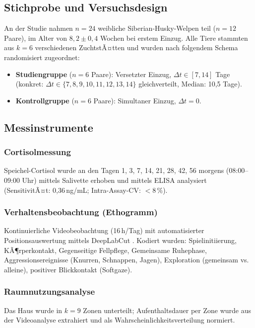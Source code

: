 ﻿\documentclass[12pt, a4paper]{article}
\theoremstyle{plain}
\theoremstyle{definition}
\theoremstyle{remark}
\newcommand{\dt}{\Delta t}
\begin{document}
\subsection{Stichprobe und Versuchsdesign}

An der Studie nahmen $n = 24$ weibliche Siberian-Husky-Welpen teil ($n = 12$
Paare), im Alter von $8{,}2 \pm 0{,}4$ Wochen bei erstem Einzug.
Alle Tiere stammten aus $k = 6$ verschiedenen ZuchtstÃ¤tten und wurden nach
folgendem Schema randomisiert zugeordnet:

\begin{itemize}[leftmargin=*]
  \item \textbf{Studiengruppe} ($n = 6$ Paare): Versetzter Einzug, $\dt \in [7, 14]$
    Tage (konkret: $\dt \in \{7, 8, 9, 10, 11, 12, 13, 14\}$ gleichverteilt,
    Median: 10{,}5 Tage).
  \item \textbf{Kontrollgruppe} ($n = 6$ Paare): Simultaner Einzug, $\dt = 0$.
\end{itemize}

\subsection{Messinstrumente}

\subsubsection{Cortisolmessung}
Speichel-Cortisol wurde an den Tagen 1, 3, 7, 14, 21, 28, 42, 56
morgens (08:00--09:00 Uhr) mittels Salivette erhoben und mittels
ELISA analysiert (SensitivitÃ¤t: 0{,}36\,ng/mL; Intra-Assay-CV:
$<$8\,\%).

\subsubsection{Verhaltensbeobachtung (Ethogramm)}
Kontinuierliche Videobeobachtung (16\,h/Tag) mit automatisierter
Positionsauswertung mittels DeepLabCut \cite{mathis2018deeplabcut}.
Kodiert wurden: Spielinitiierung, KÃ¶rperkontakt, Gegenseitige Fellpflege,
Gemeinsame Ruhephase, Aggressionsereignisse (Knurren, Schnappen, Jagen),
Exploration (gemeinsam vs. alleine), positiver Blickkontakt (Softgaze).

\subsubsection{Raumnutzungsanalyse}
Das Haus wurde in $k = 9$ Zonen unterteilt; Aufenthaltsdauer per Zone
wurde aus der Videoanalyse extrahiert und als Wahrscheinlichkeitsverteilung
normiert.
\end{document}

